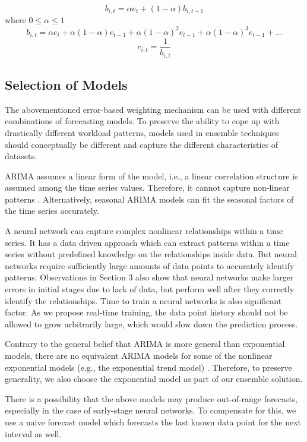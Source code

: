 $$b_{i,t}= \alpha e_t + (1-\alpha)b_{i,t-1}$$
where $0\leq \alpha \leq 1$
$$b_{i,t}=\alpha e_t + \alpha(1-\alpha)e_{t-1}+\alpha(1-\alpha)^2e_{t-1}+\alpha(1-\alpha)^3e_{t-1}+ . .. $$
$$c_{i,t}=\frac{1}{b_{i,t}}$$

\subsection{Selection of Models}
The abovementioned error-based weighting mechanism can be used with different combinations of forecasting models. To preserve the ability to cope up with drastically different workload patterns, models used in ensemble techniques should conceptually be different and capture the different characteristics of datasets.

ARIMA assumes a linear form of the model, i.e., a linear correlation structure is assumed among the time series values. Therefore, it cannot capture non-linear patterns \cite{Zhang_2003}. Alternatively, seasonal ARIMA models can fit the seasonal factors of the time series accurately.

A neural network can capture complex nonlinear relationships within a time series. It has a data driven approach which can extract patterns within a time series without predefined knowledge on the relationships inside data. But neural networks require sufficiently large amounts of data points to accurately identify patterns. Observations in Section 3 also show that neural networks make larger errors in initial stages due to lack of data, but perform well after they correctly identify the relationships. Time to train a neural networks is also significant factor. As we propose real-time training, the data point history should not be allowed to grow arbitrarily large, which would slow down the prediction process.

Contrary to the general belief that ARIMA is more general than exponential models, there are no equivalent ARIMA models for some of the nonlinear exponential models (e.g., the exponential trend model) \cite{Forecasting_OTexts}. Therefore, to preserve generality, we also choose the exponential model as part of our ensemble solution.

There is a possibility that the above models may produce out-of-range forecasts, especially in the case of early-stage neural networks. To compensate for this, we use a naive forecast model which forecasts the last known data point for the next interval as well.

